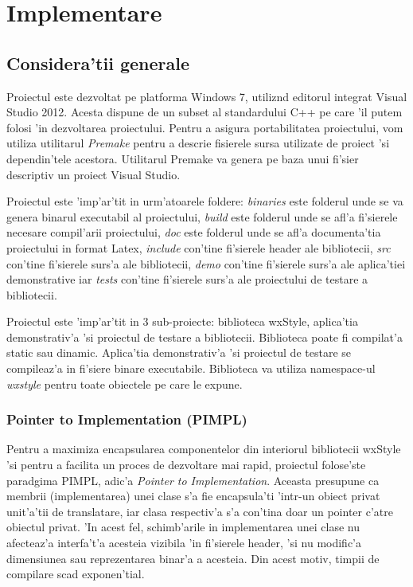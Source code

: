 \chapter{Implementare}
\pagestyle{headings}

\section{Considera'tii generale}

Proiectul este dezvoltat pe platforma Windows 7, utiliz{\ia}nd editorul integrat Visual Studio 2012. Acesta dispune de un subset al standardului C++ pe care 'il putem folosi 'in dezvoltarea proiectului. Pentru a asigura portabilitatea proiectului, vom utiliza utilitarul \emph{Premake} pentru a descrie fisierele sursa utilizate de proiect 'si dependin'tele acestora. Utilitarul Premake va genera pe baza unui fi'sier descriptiv un proiect Visual Studio. 

\medskip

Proiectul este 'imp'ar'tit in urm'atoarele foldere: \emph{binaries} este folderul unde se va genera binarul executabil al proiectului, \emph{build} este folderul unde se afl'a fi'sierele necesare compil'arii proiectului, \emph{doc} este folderul unde se afl'a documenta'tia proiectului in format Latex, \emph{include} con'tine fi'sierele header ale bibliotecii, \emph{src} con'tine fi'sierele surs'a ale bibliotecii, \emph{demo} con'tine fi'sierele surs'a ale aplica'tiei demonstrative iar \emph{tests} con'tine fi'sierele surs'a ale proiectului de testare a bibliotecii.

\medskip

Proiectul este 'imp'ar'tit in 3 sub-proiecte: biblioteca wxStyle, aplica'tia demonstrativ'a 'si proiectul de testare a bibliotecii. Biblioteca poate fi compilat'a static sau dinamic. Aplica'tia demonstrativ'a 'si proiectul de testare se compileaz'a in fi'siere binare executabile. Biblioteca va utiliza namespace-ul \emph{wxstyle} pentru toate obiectele pe care le expune.

\subsection{Pointer to Implementation (PIMPL)}

Pentru a maximiza encapsularea componentelor din interiorul bibliotecii wxStyle 'si pentru a facilita un proces de dezvoltare mai rapid, proiectul folose'ste paradgima PIMPL, adic'a \emph{Pointer to Implementation}. Aceasta  presupune ca membrii (implementarea) unei clase s'a fie encapsula'ti 'intr-un obiect privat unit'a'tii de translatare, iar clasa respectiv'a s'a con'tina doar un pointer c'atre obiectul privat. 'In acest fel, schimb'arile in implementarea unei clase nu afecteaz'a interfa't'a acesteia vizibila 'in fi'sierele header, 'si nu modific'a dimensiunea sau reprezentarea binar'a a acesteia. Din acest motiv, timpii de compilare scad exponen'tial.

